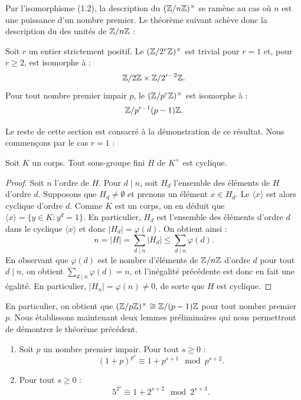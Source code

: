 \documentclass[]{report}
\begin{document}
Par l'isomorphisme (1.2), la description du \gr $(\mathbb{Z}/n\mathbb{Z})^{\times}$ se ramène au cas où $n$ est une puissance d'un nombre premier. Le théorème suivant achève donc la description du \gr des unités de $\mathbb{Z}/n\mathbb{Z}$ :

\begin{tm}{}{}
    Soit $r$ un entier strictement positif. Le \gr $(\mathbb{Z}/2^r\mathbb{Z})^{\times}$ est trivial pour $r = 1$ et, pour $r \ge 2$, est isomorphe à :
    \[\mathbb{Z}/2\mathbb{Z} \times \mathbb{Z}/2^{r-2}\mathbb{Z}.\]
    Pour tout nombre premier impair $p$, le \gr $(\mathbb{Z}/p^r\mathbb{Z})^{\times}$ est isomorphe à :
    \[\mathbb{Z}/p^{r-1}(p-1)\mathbb{Z}.\]
\end{tm}

Le reste de cette section est consacré à la démonstration de ce résultat. Nous commençons par le cas $r = 1$ :

\begin{prop}{}{}
    Soit $K$ un corps. Tout sous-groupe fini $H$ de $K^{\times}$ est cyclique.
\end{prop}

\begin{proof}
    Soit $n$ l'ordre de $H$. Pour $d \mid n$, soit $H_d$ l'ensemble des éléments de $H$ d'ordre $d$. Supposons que $H_d \neq \emptyset$ et prenons un élément $x \in H_d$. Le \gr $\langle x \rangle$ est alors cyclique d'ordre $d$. Comme $K$ est un corps, on en déduit que $\langle x \rangle = \{y \in K : y^d = 1\}$. En particulier, $H_d$ est l'ensemble des éléments d'ordre $d$ dans le \gr cyclique $\langle x \rangle$ et donc $|H_d| = \varphi(d)$. On obtient ainsi :
    \[n = |H| = \sum_{d \mid n} |H_d| \le \sum_{d \mid n} \varphi(d).\]
    En observant que $\varphi(d)$ est le nombre d'éléments de $\mathbb{Z}/n\mathbb{Z}$ d'ordre $d$ pour tout $d \mid n$, on obtient $\sum_{d \mid n}\varphi(d) = n$, et l'inégalité précédente est donc en fait une égalité. En particulier, $|H_n| = \varphi(n) \neq 0$, de sorte que $H$ est cyclique.
\end{proof}

En particulier, on obtient que $(\mathbb{Z}/p\mathbb{Z})^{\times} \cong \mathbb{Z}/(p-1)\mathbb{Z}$ pour tout nombre premier $p$. Nous établissons maintenant deux lemmes préliminaires qui nous permettront de démontrer le théorème précédent.

\begin{lm}{}{}
    \begin{enumerate}
        \item[(i)] Soit $p$ un nombre premier impair. Pour tout $s \ge 0$ :
        \[(1 + p)^{p^s} \equiv 1 + p^{s+1} \mod p^{s+2}.\]
        \item[(ii)] Pour tout $s \ge 0$ :
        \[5^{2^s} \equiv 1 + 2^{s+2} \mod 2^{s+3}.\]
    \end{enumerate}
\end{lm}
\end{document}
